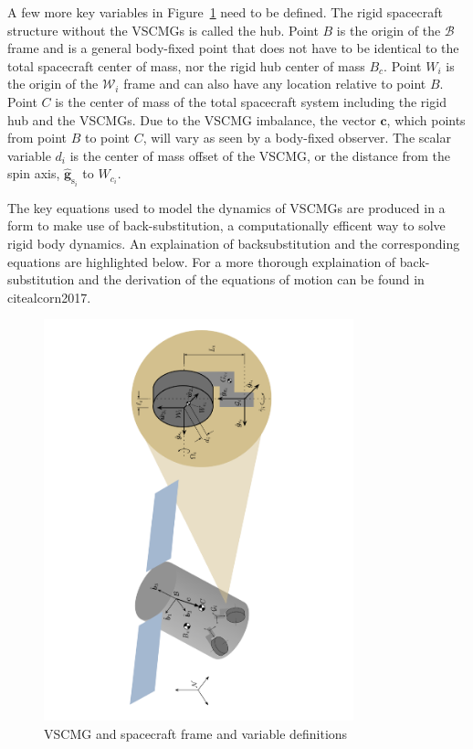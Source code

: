 A few more key variables in Figure~\ref{fig:scplusVSCMG} need to be defined. The rigid spacecraft structure without the VSCMGs is called the hub.  Point $B$ is the origin of the $\mathcal{B}$ frame and is a general body-fixed point that does not have to be identical to the total spacecraft center of mass, nor the rigid hub center of mass $B_{c}$. Point $W_i$ is the origin of the $\mathcal{W}_i$ frame and can also have any location relative to point $B$. Point $C$ is the center of mass of the total spacecraft system including the rigid hub and the VSCMGs. Due to the VSCMG imbalance, the vector $\bm c$, which points from point $B$ to point $C$, will vary as seen by a body-fixed observer. The scalar variable $d_i$ is the center of mass offset of the VSCMG, or the distance from the spin axis, $\hat{\bm g}_{\text{s}_i}$ to $W_{c_i}$.  

The key equations used to model the dynamics of VSCMGs are produced in a form to make use of back-substitution, a computationally efficent way to solve rigid body dynamics. An explaination of backsubstitution and the corresponding equations are highlighted below. For a more thorough explaination of back-substitution and the derivation of the equations of motion can be found in  \cite{schaub} \cite{newRef} cite{alcorn2017}.

\begin{figure}[htbp]
	\centerline{
		\includegraphics[angle=-90,width=0.8\textwidth]{Figures/scplusVSCMG}}
	\caption{VSCMG and spacecraft frame and variable definitions}
	\label{fig:scplusVSCMG}
\end{figure}

